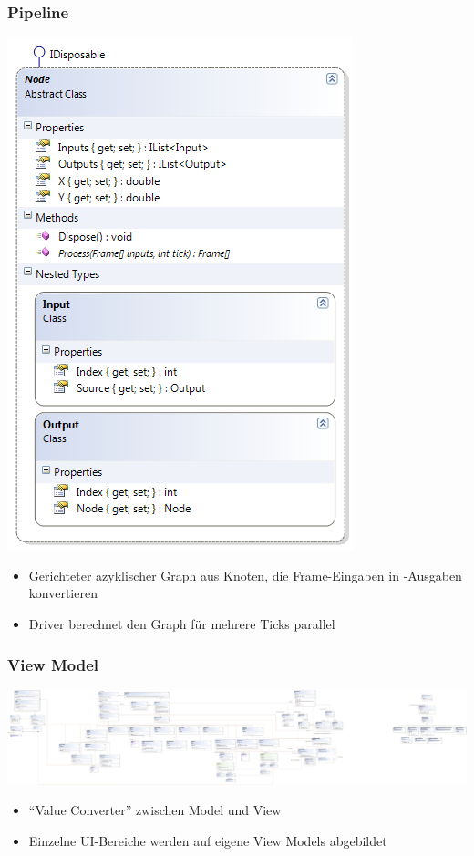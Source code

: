 \documentclass[t]{beamer}
\begin{document}
\begin{frame}
\frametitle{Pipeline}
\noindent
\begin{minipage}{5cm}
    \includegraphics[height=0.9\textheight]{../YuvKA.Pipeline/node.png}
\end{minipage}
\hfill
\begin{minipage}{6cm}
    \begin{itemize}
        \item Gerichteter azyklischer Graph aus Knoten, die Frame-Eingaben in -Ausgaben konvertieren
        \item Driver berechnet den Graph für mehrere Ticks parallel
    \end{itemize}
\end{minipage}
\end{frame}

\begin{frame}
\frametitle{View Model}
\noindent
\begin{minipage}{5cm}
    \includegraphics[trim=135cm 5cm 50cm 0,clip,height=\textheight]{../Diagrams/classdiagram.png}
\end{minipage}
\hfill
\begin{minipage}{5.5cm}
    \begin{itemize}
        \item ``Value Converter'' zwischen Model und View
        \item Einzelne UI-Bereiche werden auf eigene View Models abgebildet
    \end{itemize}
\end{minipage}
\end{frame}
\end{document}
